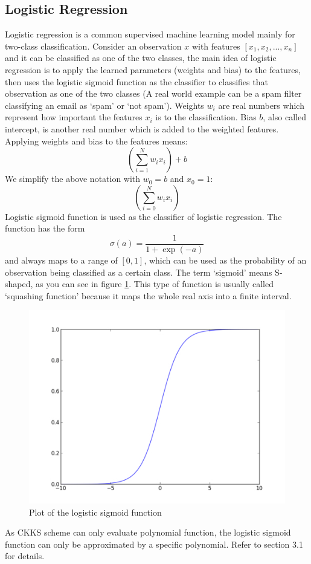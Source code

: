     \subsection{Logistic Regression} 
    Logistic regression is a common supervised machine learning model mainly for two-class classification. Consider an observation $x$ with features $[x_1, x_2,...,x_n]$ and it can be classified as one of the two classes, the main idea of logistic regression is to apply the learned parameters (weights and bias) to the features, then uses the logistic sigmoid function as the classifier to classifies that observation as one of the two classes (A real world example can be a spam filter classifying an email as `spam' or `not spam'). Weights $w_i$ are real numbers which represent how important the features $x_i$ is to the classification. \@{}Bias $b$, also called intercept, is another real number which is added to the weighted features. Applying weights and bias to the features means:
    \[
    \left(\sum_{i = 1}^{N}w_ix_i \right) + b
    \]
    We simplify the above notation with $w_0 = b$ and $x_0 = 1$:
    \[
    \left(\sum_{i = 0}^{N}w_ix_i \right)
    \]
    Logistic sigmoid function is used as the classifier of logistic regression. The function has the form
    \[
    \sigma(a) = \frac{1}{1 + \exp(-a)}
    \]
    and always maps to a range of $[0, 1]$, which can be used as the probability of an observation being classified as a certain class. The term `sigmoid' means S-shaped, as you can see in figure \ref{fig:LR}. This type of function is usually called `squashing function' because it maps the whole real axis into a finite interval. 
       \begin{figure}[ht]
        \centering
        \includegraphics[width=0.5\linewidth]{images/LR.jpg}
        \caption{Plot of the logistic sigmoid function}
        \label{fig:LR}
    \end{figure} 
    As CKKS scheme can only evaluate polynomial function, the logistic sigmoid function can only be approximated by a specific polynomial. Refer to section 3.1 for details.\\
